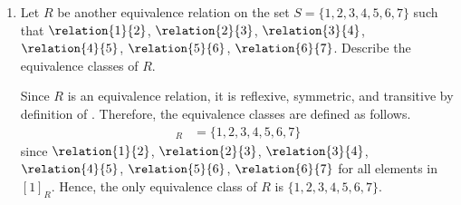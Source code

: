 \begin{enumerate}
\begin{enumerate}
\begin{subanswer}
        since $\relation{1}{3}$, $\relation{3}{4}$, $\relation{4}{7}$ for all elements in $[1]_R$,
        $\relation{2}{6}$ for all elements in $[2]_R$, and
        $5$ is not related to any other element.
        Hence, the three equivalence classes of $R$ are $\{1,3,4,7\}, \{2,6\},$ and $\{5\}$.
        \begin{center}
        \end{center}
      \end{subanswer}
    \item Let $R$ be another equivalence relation on the set $S=\{1,2,3,4,5,6,7\}$ 
    such that $\relation{1}{2}$, $\relation{2}{3}$, $\relation{3}{4}$, 
    $\relation{4}{5}$, $\relation{5}{6}$, $\relation{6}{7}$. 
    Describe the equivalence classes of $R$.
    \begin{subanswer}
      Since $R$ is an equivalence relation, it is reflexive, symmetric, and 
      transitive by definition of .
      Therefore, the equivalence classes are defined as follows.
      \begin{align*}
        [1]_R &= \{1,2,3,4,5,6,7\}
      \end{align*}
      since $\relation{1}{2}$, $\relation{2}{3}$, $\relation{3}{4}$, 
      $\relation{4}{5}$, $\relation{5}{6}$, $\relation{6}{7}$ for all elements in $[1]_R$.
      Hence, the only equivalence class of $R$ is $\{1,2,3,4,5,6,7\}$.
    \end{subanswer}
  \end{enumerate}


\end{enumerate}
